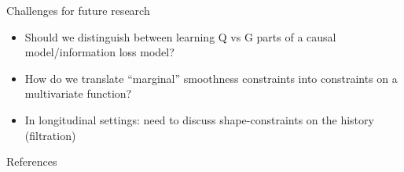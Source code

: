 \documentclass[smaller]{beamer}\usepackage{listings}
\begin{document}
\begin{frame}[label={sec:org4c44df0}]{Challenges for future research}
\begin{itemize}
\item Should we distinguish between learning Q vs G parts of a causal
model/information loss model?

\item How do we translate ``marginal'' smoothness constraints into 
constraints on a multivariate function?

\item In longitudinal settings: need to discuss shape-constraints on the
history (filtration)
\end{itemize}
\end{frame}


\begin{frame}[label={sec:org8ce415e}]{References}
\footnotesize 
\end{frame}
\end{document}
